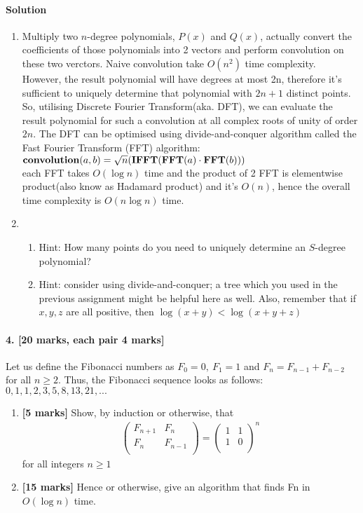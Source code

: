 \documentclass[a4paper]{scrartcl}
\newcommand{\CON}{\pPkey{convolution}}
\newcommand{\FFT}{\pPkey{FFT}}
\newcommand{\IFFT}{\pPkey{IFFT}}
\begin{document}
\paragraph{Solution}
\begin{enumerate}[label=(\alph*)]
\item Multiply two $n$-degree polynomials, $P(x)$ and $Q(x)$, actually convert the coefficients of those polynomials into 2 vectors and perform convolution on these two verctors. Naive convolution take $O(n^2)$ time complexity.\\
However, the result polynomial will have degrees at most 2n, therefore it's sufficient to uniquely determine that polynomial with $2n+1$ distinct points. So, utilising Discrete Fourier Transform(aka. DFT), we can evaluate the result polynomial for such a convolution at all complex roots of unity of order $2n$. The DFT can be optimised using divide-and-conquer algorithm called the Fast Fourier Transform (FFT) algorithm:\\
$ \CON(a,b) = \sqrt{n}(\IFFT(\FFT(a) \cdot \FFT(b)))$\\
each FFT takes $O(\log{n})$ time and the product of 2 FFT is elementwise product(also know as Hadamard product) and it's $O(n)$, hence the overall time complexity is $O(n\log{n})$ time.
\item 
\begin{enumerate}[label=(\roman*)]  
  \item Hint: How many points do you need to uniquely determine an $S$-degree polynomial?
  \item Hint: consider using divide-and-conquer; a tree which you used in the previous assignment might be helpful here as well. Also, remember that if $x,y,z$ are all positive, then $\log{(x + y)} < \log{(x + y + z)}$
\end{enumerate}
\end{enumerate}
\paragraph{4. [20 marks, each pair 4 marks]}
\label{sec:Question 4}
Let us define the Fibonacci numbers as $F_0=0,\ F_1=1$ and $F_n=F_{n-1}+F_{n-2}$ for all $n\geq2$. Thus, the Fibonacci sequence looks as follows: $0, 1, 1, 2, 3, 5, 8, 13, 21, . . .$
\begin{enumerate}[label=(\alph*)]
  \item{\bfseries[5 marks]} Show, by induction or otherwise, that
\begin{align*}
  \begin{pmatrix}
   F_{n+1} & F_n \\
   F_n & F_{n-1} \\
  \end{pmatrix}
  =
  \begin{pmatrix}
    1 & 1 \\
    1 & 0 \\
  \end{pmatrix}^{\!n}
\end{align*}
  for all integers $n\geq1$
  \item {\bfseries[15 marks]} Hence or otherwise, give an algorithm that finds Fn in $O(\log{n})$ time.
\end{enumerate}
\end{document}
